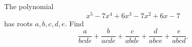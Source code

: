 The polynomial
\[x^5-7x^4+6x^3-7x^2+6x-7\]
has roots $a,b,c,d,e$. Find
\[\dfrac{a}{bcde}+\dfrac{b}{acde}+\dfrac{c}{abde}+\dfrac{d}{abce}+\dfrac{e}{abcd}.\]
